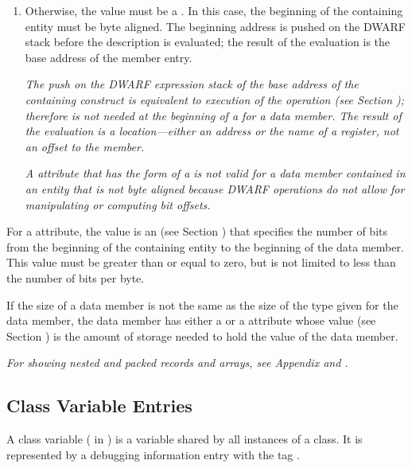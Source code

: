 {\begin{enumerate}[1. ]
\item Otherwise, the value must be a .
In
this case, the beginning of the containing entity must be byte
aligned. The beginning address is pushed on the DWARF stack
before the  description is evaluated; the result of
the evaluation is the base address of the member entry.

\textit{The push on the DWARF expression stack of the base address of
the containing construct is equivalent to execution of the
\DWOPpushobjectaddress{} operation 
(see Section );
\DWOPpushobjectaddress{} therefore 
is not needed at the
beginning of a  for a data member. 
The
result of the evaluation is a location---either an address or
the name of a register, not an offset to the member.}

\textit{A \DWATdatamemberlocation{} 
attribute 
that has the form of a
 is not valid for a data member contained
in an entity that is not byte aligned because DWARF operations
do not allow for manipulating or computing bit offsets.}

\end{enumerate}

For a \DWATdatabitoffset{} attribute, 
the value is an  
(see Section ) 
that specifies the number of bits
from the beginning of the containing entity to the beginning
of the data member. This value must be greater than or equal
to zero, but is not limited to less than the number of bits
per byte.

If the size of a data member is not the same as the size
of the type given for the data member, the data member has
either a \DWATbytesize{} 
or a \DWATbitsize{} attribute whose
 value 
(see Section ) 
is the amount
of storage needed to hold the value of the data member.

\textit{For showing nested and packed records and arrays, 
see Appendix  and 
.}

\subsection{Class Variable Entries}
\label{chap:classvariableentries}
A class variable ( in 
) is a variable shared by all instances
of a class. It is represented by a
debugging information entry with the tag \DWTAGvariable.

}
